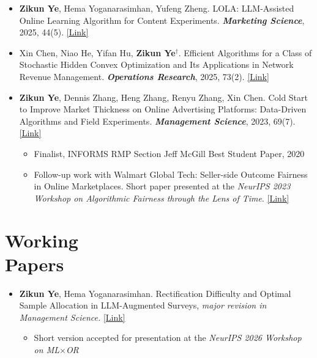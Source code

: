 \documentclass[margin,line]{resume}
\begin{document}
\begin{resume}
\begin{itemize}[topsep=-5mm, leftmargin=0mm]
\vspace{\medskipamount}

\item[] \textbf{Zikun Ye}, Hema Yoganarasimhan, Yufeng Zheng. LOLA: LLM-Assisted Online Learning Algorithm for Content Experiments. \textit{\textbf{Marketing Science}}, 2025, 44(5). \href{https://pubsonline.informs.org/doi/10.1287/mksc.2024.0990}{[Link]}

\vspace{\medskipamount}

 \item[] Xin Chen, Niao He, Yifan Hu, \textbf{Zikun Ye}$^{\dagger}$. Efficient Algorithms for a Class of Stochastic Hidden Convex Optimization and Its Applications in Network Revenue Management. \textit{\textbf{Operations Research}}, 2025, 73(2). \href{https://pubsonline.informs.org/doi/full/10.1287/opre.2022.0216}{[Link]}

\vspace{\medskipamount}

\item[] \textbf{Zikun Ye}, Dennis Zhang, Heng Zhang, Renyu Zhang, Xin Chen. Cold Start to Improve Market Thickness on Online Advertising Platforms: Data-Driven Algorithms and Field Experiments. \textbf{\textit{Management Science}}, 2023, 69(7). \href{https://pubsonline.informs.org/doi/abs/10.1287/mnsc.2022.4550?journalCode=mnsc}{[Link]}
     \begin{itemize}
         \item [-] {{Finalist}}, INFORMS RMP Section Jeff McGill Best Student Paper, 2020
         \item [-] Follow-up work with Walmart Global Tech: Seller-side Outcome Fairness in Online Marketplaces. Short paper presented at the \textit{NeurIPS 2023 Workshop on Algorithmic Fairness through the Lens of Time}. \href{https://arxiv.org/abs/2312.03253}{[Link]}
     \end{itemize}

\end{itemize}


\section{\mysidestyle Working\\ Papers}

\begin{itemize}[topsep=-5mm, leftmargin=0mm]

\item[] \textbf{Zikun Ye}, Hema Yoganarasimhan. Rectification Difficulty and Optimal Sample Allocation in LLM-Augmented Surveys, \textit{major revision in Management Science.} \href{https://arxiv.org/abs/2604.17267}{[Link]}
    \begin{itemize}
        \item [-] Short version accepted for presentation at the \textit{NeurIPS 2026 Workshop on ML$\times$OR}
    \end{itemize}


\end{itemize}
\end{resume}
\end{document}
